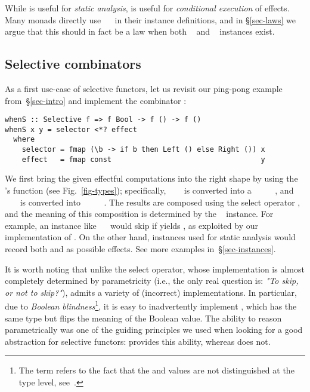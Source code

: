 \noindent
While  is useful for \emph{static analysis},  is
useful for \emph{conditional execution} of effects. Many monads directly use
~\hs{=}~ in their  instance definitions,
and in \S\ref{sec-laws} we argue that this should in fact be a law when both
~ and ~ instances exist.

\subsection{Selective combinators}\label{sec-combinators}

As a first use-case of selective functors, let us revisit our ping-pong example
from~\S\ref{sec-intro} and implement the combinator :

\vspace{1mm}
\begin{verbatim}
whenS :: Selective f => f Bool -> f () -> f ()
whenS x y = selector <*? effect
  where
    selector = fmap (\b -> if b then Left () else Right ()) x
    effect   = fmap const                                   y
\end{verbatim}
\vspace{1mm}

\noindent
We first bring the given effectful computations into the right shape by using
the 's function  (see
Fig.~\ref{fig-types}); specifically, ~\hs{::}~~ is
converted into a ~\hs{::}~~~\hs{()}~\hs{())}, and
~\hs{::}~~\hs{()} is converted into
~\hs{::}~~\hs{(()}~\hs{->}~\hs{())}. The results are composed
using the select operator , and the meaning of this composition is
determined by the ~ instance. For example, an instance
like ~\hs{=}~ would skip  if  yields , as
exploited by our implementation of . On the other hand, instances
used for static analysis would record both  and  as possible
effects. See more examples in~\S\ref{sec-instances}.

It is worth noting that unlike the select operator, whose implementation is
almost completely determined by parametricity (i.e., the only real question is:
\emph{"To skip, or not to skip?"}),  admits a variety of (incorrect)
implementations. In particular, due to \emph{Boolean blindness}\footnote{The
term refers to the fact that the  and  values are not
distinguished at the type level, see~\citet{boolean-blindness}.},
it is easy to inadvertently implement , which has the same type but
flips the meaning of the Boolean value. The ability to reason parametrically was
one of the guiding principles we used when looking for a good abstraction for
selective functors:  provides this ability, whereas  does
not.

